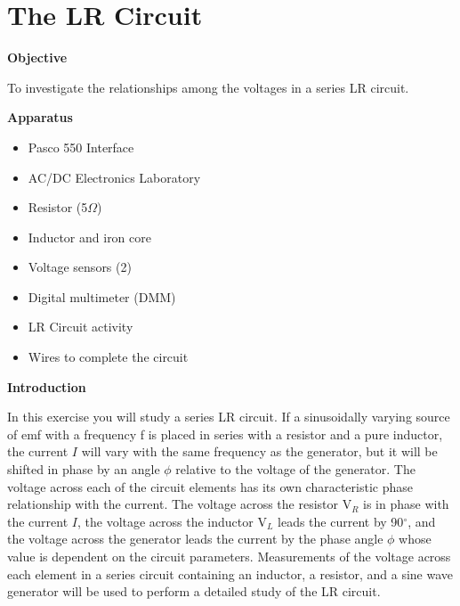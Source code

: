 
\section{The LR Circuit}

\makelabheader %

\textbf{Objective} 

To investigate the relationships among the voltages in a series LR
circuit.

\textbf{Apparatus} 

\begin{itemize}
\item Pasco 550 Interface
\item AC/DC Electronics Laboratory
\item Resistor (5$\Omega$)
\item Inductor and iron core 
\item Voltage sensors (2)
\item Digital multimeter (DMM)
\item LR Circuit activity
\item Wires to complete the circuit
\end{itemize}
\textbf{Introduction} 

In this exercise you will study a series LR circuit. If a sinusoidally
varying source of emf with a frequency f is placed in series with
a resistor and a pure inductor, the current $I$ will vary with the same
frequency as the generator, but it will be shifted in phase by an
angle \( \phi  \) relative to the voltage of the generator. The voltage
across each of the circuit elements has its own characteristic phase
relationship with the current. The voltage across the resistor V\( _{R} \)
is in phase with the current $I$, the voltage across the inductor V\( _{L} \)
leads the current by 90\( ^{\circ } \), and the voltage across the
generator leads the current by the phase angle \( \phi  \) whose
value is dependent on the circuit parameters. Measurements of the
voltage across each element in a series circuit containing an inductor,
a resistor, and a sine wave generator will be used to perform a detailed
study of the LR circuit.

\vspace{0.3cm}
{\centering {} \par}
\vspace{0.3cm}

